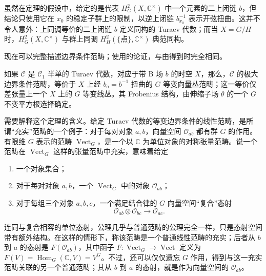 \begin{note}[2.17]\label{note:2.17}
虽然在定理的假设中，给定的是代表 $H_G^2(X,\mathbb{C}^{\times})$ 中一个元素的二上闭链 $b$，但结论只使用它在 $x_0$ 的稳定子群上的限制，以逆上闭链 $b_{x_0}^{-1}$ 表示开弦扭曲。这并不令人意外：上同调等价的二上闭链 $b$ 定义同构的 Turaev 代数；而当 $X=G/H$ 时，$H_G^2(X,\mathbb{C}^{\times})$ 与群上同调 $H_H^2(\{\text{点}\},\mathbb{C}^{\times})$ 典范同构。
\end{note}

现在可以完整描述边界条件范畴；使用的论证，与由得到时完全相同。

\begin{theorem}\label{thm:2.18}
如果 $\mathcal{C}$ 是 $\mathcal{C}_1$ 半单的 Turaev 代数，对应于带 B 场 $b$ 的时空 $X$，那么，$\mathcal{C}$ 的极大边界条件范畴，等价于 $X$ 上经 $b_o=b^{-1}$ 扭曲的 $G$ 等变向量丛范畴；这一等价仅差张量上一个 $X$ 上的 $G$ 等变线丛。其 Frobenius 结构，由伸缩子场 $\theta$ 的一个 $G$ 不变平方根选择确定。
\end{theorem}

需要解释这个定理的含义。给定 Turaev 代数的等变边界条件的线性范畴，是所谓“充实”范畴的一个例子：对于每对对象 $a,b$，向量空间 $\mathcal{O}_{ab}$ 都有群 $G$ 的作用。有限维 $G$ 表示的范畴 $\operatorname{Vect}_G$，是一个以 $\mathbb{C}$ 为单位对象的对称张量范畴。说一个范畴在 $\operatorname{Vect}_G$ 这样的张量范畴中充实，意味着给定
\begin{enumerate}[label=(\roman*)]
\item 一个对象集合；
\item 对于每对对象 $a,b$，一个 $\operatorname{Vect}_G$ 中的对象 $\mathcal{O}_{ab}$；
\item 对于每组三个对象 $a,b,c$，一个满足结合律的 $G$ 向量空间“复合”态射
\[
\mathcal{O}_{ab}\otimes\mathcal{O}_{bc}\longrightarrow\mathcal{O}_{ac}.
\]
\end{enumerate}

连同与复合相容的单位态射，公理几乎与普通范畴的公理完全一样，只是态射空间带有额外结构。在这样的情形下，称该范畴是一个普通线性范畴的充实；后者从 $b$ 到 $a$ 的态射是 $F(\mathcal{O}_{ab})$，其中函子 $F\colon\operatorname{Vect}_G\to\operatorname{Vect}$ 定义为 $F(V)=\operatorname{Hom}_G(\mathbb{C},V)=V^G$。不过，还可以仅仅遗忘 $G$ 作用，得到与这一充实范畴关联的另一个普通范畴；其从 $b$ 到 $a$ 的态射，就是作为向量空间的 $\mathcal{O}_{ab}$。

